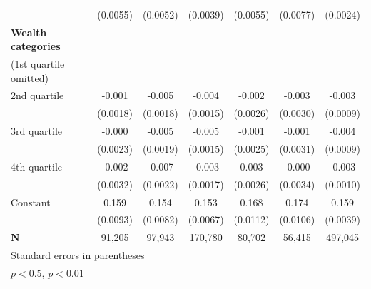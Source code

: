 {\begin{tabular}{l*{6}{c}}
                    &    (0.0055)        &    (0.0052)        &    (0.0039)        &    (0.0055)        &    (0.0077)        &    (0.0024)        \\
\addlinespace
\textbf{Wealth categories} \\ (1st quartile omitted)&                    &                    &                    &                    &                    &                    \\
\addlinespace
\hspace*{1em}2nd quartile        &      -0.001        &      -0.005\sym{*} &      -0.004\sym{**}&      -0.002        &      -0.003\sym{*} &      -0.003\sym{**}\\
                    &    (0.0018)        &    (0.0018)        &    (0.0015)        &    (0.0026)        &    (0.0030)        &    (0.0009)        \\
\addlinespace
\hspace*{1em}3rd quartile        &      -0.000        &      -0.005\sym{**}&      -0.005\sym{**}&      -0.001        &      -0.001        &      -0.004\sym{**}\\
                    &    (0.0023)        &    (0.0019)        &    (0.0015)        &    (0.0025)        &    (0.0031)        &    (0.0009)        \\
\addlinespace
\hspace*{1em}4th quartile        &      -0.002\sym{*} &      -0.007\sym{**}&      -0.003\sym{*} &       0.003\sym{*} &      -0.000        &      -0.003\sym{**}\\
                    &    (0.0032)        &    (0.0022)        &    (0.0017)        &    (0.0026)        &    (0.0034)        &    (0.0010)        \\
\addlinespace
\hspace*{1em}Constant            &       0.159\sym{**}&       0.154\sym{**}&       0.153\sym{**}&       0.168\sym{**}&       0.174\sym{**}&       0.159\sym{**}\\
                    &    (0.0093)        &    (0.0082)        &    (0.0067)        &    (0.0112)        &    (0.0106)        &    (0.0039)        \\
\midrule
\textbf{N}          &      91,205        &      97,943        &     170,780        &      80,702        &      56,415        &     497,045        \\
\bottomrule
\multicolumn{7}{l}{\footnotesize Standard errors in parentheses}\\
\multicolumn{7}{l}{\footnotesize \sym{*} \(p<0.5\), \sym{**} \(p<0.01\)}\\
\end{tabular}
}
